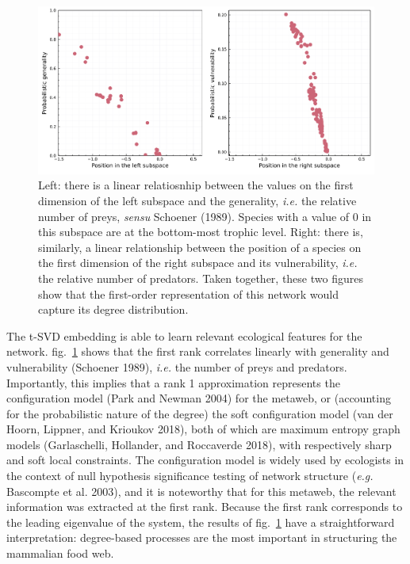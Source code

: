 \documentclass[11pt]{article}
\makeatletter
\def\maxwidth{\ifdim\Gin@nat@width>\linewidth\linewidth
\else\Gin@nat@width\fi}
\let\Oldincludegraphics\includegraphics
\renewcommand{\includegraphics}[1]{\Oldincludegraphics[width=\maxwidth]{#1}}
\makeatother
\begin{document}
\begin{figure}
\hypertarget{fig:degree}{%
\centering
\includegraphics{figures/figure-degree.png}
\caption{Left: there is a linear relatiosnhip between the values on the
first dimension of the left subspace and the generality, \emph{i.e.} the
relative number of preys, \emph{sensu} Schoener (1989). Species with a
value of 0 in this subspace are at the bottom-most trophic level. Right:
there is, similarly, a linear relationship between the position of a
species on the first dimension of the right subspace and its
vulnerability, \emph{i.e.} the relative number of predators. Taken
together, these two figures show that the first-order representation of
this network would capture its degree distribution.}\label{fig:degree}
}
\end{figure}

The t-SVD embedding is able to learn relevant ecological features for
the network. fig.~\ref{fig:degree} shows that the first rank correlates
linearly with generality and vulnerability (Schoener 1989), \emph{i.e.}
the number of preys and predators. Importantly, this implies that a rank
1 approximation represents the configuration model (Park and Newman
2004) for the metaweb, or (accounting for the probabilistic nature of
the degree) the soft configuration model (van der Hoorn, Lippner, and
Krioukov 2018), both of which are maximum entropy graph models
(Garlaschelli, Hollander, and Roccaverde 2018), with respectively sharp
and soft local constraints. The configuration model is widely used by
ecologists in the context of null hypothesis significance testing of
network structure (\emph{e.g.} Bascompte et al. 2003), and it is
noteworthy that for this metaweb, the relevant information was extracted
at the first rank. Because the first rank corresponds to the leading
eigenvalue of the system, the results of fig.~\ref{fig:degree} have a
straightforward interpretation: degree-based processes are the most
important in structuring the mammalian food web.
\end{document}
